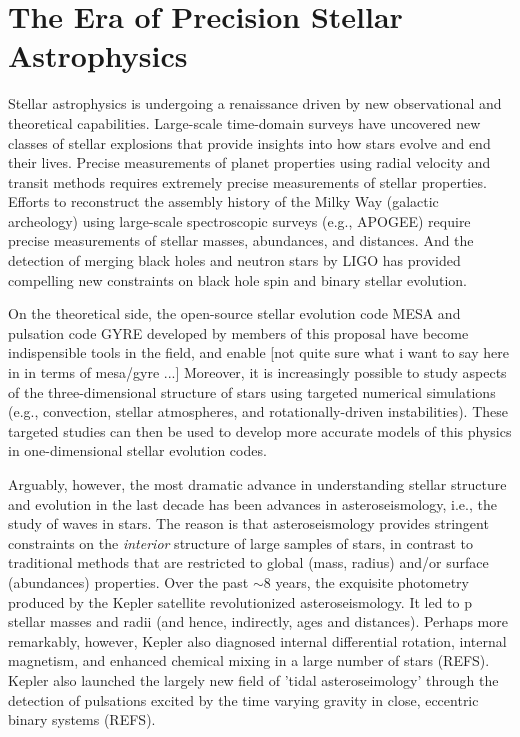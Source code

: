 \section{The Era of Precision Stellar Astrophysics}

Stellar astrophysics is undergoing a renaissance driven by new observational and theoretical capabilities. Large-scale time-domain surveys have uncovered new classes of stellar explosions that provide insights into how stars evolve and end their lives.  Precise measurements of planet properties using radial velocity and transit methods requires extremely precise measurements of stellar properties.  Efforts to reconstruct the assembly history of the Milky Way (galactic archeology) using large-scale spectroscopic surveys (e.g., APOGEE) require precise measurements of stellar masses, abundances, and distances.   And the detection of merging black holes and neutron stars by LIGO has provided compelling new constraints on black hole spin and binary stellar evolution.   

On the theoretical side, the open-source stellar evolution code MESA and pulsation code GYRE developed by members of this proposal have become indispensible tools in the field, and enable  [not quite sure what i want to say here in in terms of mesa/gyre ...]   Moreover, it is increasingly possible to study aspects of the three-dimensional structure of stars using targeted numerical simulations (e.g., convection, stellar atmospheres, and rotationally-driven instabilities).  These targeted studies can then be used to develop more accurate models of this physics in one-dimensional stellar evolution codes.

Arguably, however, the most dramatic advance in understanding stellar structure and evolution in the last decade has been advances in asteroseismology, i.e., the study of waves in stars.   The reason is that asteroseismology provides stringent constraints on the {\em interior} structure of large samples of stars, in contrast to traditional methods that are restricted to global (mass, radius) and/or surface (abundances) properties.   Over the past $\sim 8$ years, the exquisite photometry produced by the Kepler satellite revolutionized asteroseismology.  It led to p stellar masses and radii (and hence, indirectly, ages and distances).  Perhaps more remarkably, however, Kepler also diagnosed internal differential rotation, internal magnetism, and enhanced chemical mixing in a large number of stars (REFS).  Kepler also launched the largely new field of 'tidal asteroseimology' through the detection of pulsations excited by the time varying gravity in close, eccentric binary systems (REFS). 

